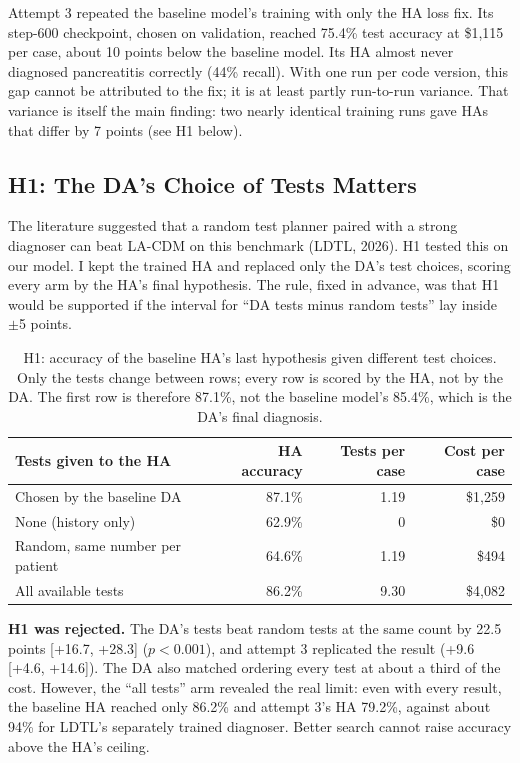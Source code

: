 \documentclass[11pt]{article}
\begin{document}
Attempt 3 repeated the baseline model's training with only the HA loss fix. Its step-600
checkpoint, chosen on validation, reached 75.4\% test accuracy at \$1,115 per
case, about 10 points below the baseline model. Its HA almost never diagnosed
pancreatitis correctly (44\% recall). With one run per code version, this gap
cannot be attributed to the fix; it is at least partly run-to-run variance. That
variance is itself the main finding: two nearly identical training runs gave
HAs that differ by 7 points (see H1 below).

\subsection*{H1: The DA's Choice of Tests Matters}

The literature suggested that a random test planner paired with a strong
diagnoser can beat LA-CDM on this benchmark (LDTL, 2026). H1 tested this on our
model. I kept the trained HA and replaced only the DA's test choices, scoring
every arm by the HA's final hypothesis. The rule, fixed in advance, was that H1
would be supported if the interval for ``DA tests minus random tests'' lay
inside $\pm$5 points.

\begin{table}[ht]
  \centering
  \caption{H1: accuracy of the baseline HA's last hypothesis given different test
  choices. Only the tests change between rows; every row is scored by the HA, not by
  the DA. The first row is therefore 87.1\%, not the baseline model's 85.4\%, which
  is the DA's final diagnosis.}
  \label{tab:h1}
  \small
  \begin{tabular}{lrrr}
    \toprule
    Tests given to the HA & HA accuracy & Tests per case & Cost per case \\
    \midrule
    Chosen by the baseline DA & 87.1\% & 1.19 & \$1,259 \\
    None (history only) & 62.9\% & 0 & \$0 \\
    Random, same number per patient & 64.6\% & 1.19 & \$494 \\
    All available tests & 86.2\% & 9.30 & \$4,082 \\
    \bottomrule
  \end{tabular}
\end{table}

\textbf{H1 was rejected.} The DA's tests beat random tests at the same count by
22.5 points [+16.7, +28.3] ($p < 0.001$), and attempt 3 replicated the result
(+9.6 [+4.6, +14.6]). The DA also matched ordering every test at about a third
of the cost. However, the ``all tests'' arm revealed the real limit: even with
every result, the baseline HA reached only 86.2\% and attempt 3's HA 79.2\%,
against about 94\% for LDTL's separately trained diagnoser. Better search cannot
raise accuracy above the HA's ceiling.
\end{document}
